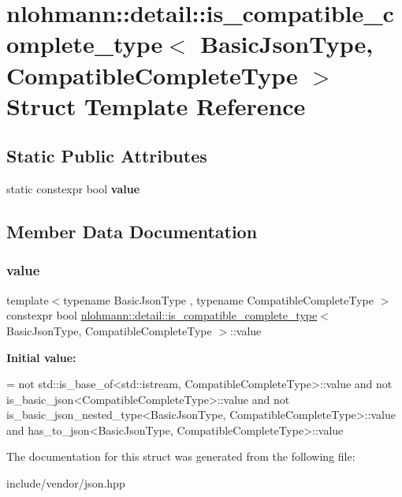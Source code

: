 \hypertarget{structnlohmann_1_1detail_1_1is__compatible__complete__type}{}\section{nlohmann\+:\+:detail\+:\+:is\+\_\+compatible\+\_\+complete\+\_\+type$<$ Basic\+Json\+Type, Compatible\+Complete\+Type $>$ Struct Template Reference}
\label{structnlohmann_1_1detail_1_1is__compatible__complete__type}
\subsection*{Static Public Attributes}
\begin{DoxyCompactItemize}
\item 
static constexpr bool {\bfseries value}
\end{DoxyCompactItemize}


\subsection{Member Data Documentation}
\mbox{\label{structnlohmann_1_1detail_1_1is__compatible__complete__type_a34bed4700a302b79feb045b6bdbda9aa}} 
\subsubsection{\texorpdfstring{value}{value}}
{\footnotesize\ttfamily template$<$typename Basic\+Json\+Type , typename Compatible\+Complete\+Type $>$ \\
constexpr bool \mbox{\hyperlink{structnlohmann_1_1detail_1_1is__compatible__complete__type}{nlohmann\+::detail\+::is\+\_\+compatible\+\_\+complete\+\_\+type}}$<$ Basic\+Json\+Type, Compatible\+Complete\+Type $>$\+::value\hspace{0.3cm}{\ttfamily [static]}}

{\bfseries Initial value\+:}
\begin{DoxyCode}
=
        not std::is\_base\_of<std::istream, CompatibleCompleteType>::value and
        not is\_basic\_json<CompatibleCompleteType>::value and
        not is\_basic\_json\_nested\_type<BasicJsonType, CompatibleCompleteType>::value and
        has\_to\_json<BasicJsonType, CompatibleCompleteType>::value
\end{DoxyCode}


The documentation for this struct was generated from the following file\+:\begin{DoxyCompactItemize}
\item 
include/vendor/json.\+hpp\end{DoxyCompactItemize}
